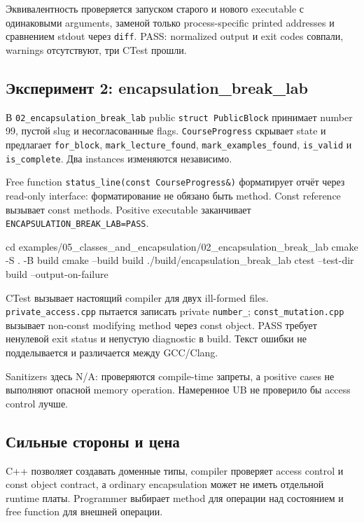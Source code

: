 Эквивалентность проверяется запуском старого и нового executable с одинаковыми
arguments, заменой только process-specific printed addresses и сравнением
stdout через \texttt{diff}. PASS: normalized output и exit codes совпали,
warnings отсутствуют, три CTest прошли.

\subsection{Эксперимент 2: encapsulation\_break\_lab}

В \texttt{02\_encapsulation\_break\_lab} public
\texttt{struct PublicBlock} принимает number 99, пустой slug и несогласованные
flags. \texttt{CourseProgress} скрывает state и предлагает
\texttt{for\_block}, \texttt{mark\_lecture\_found},
\texttt{mark\_examples\_found}, \texttt{is\_valid} и
\texttt{is\_complete}. Два instances изменяются независимо.

Free function \texttt{status\_line(const CourseProgress\&)} форматирует отчёт
через read-only interface: форматирование не обязано быть method. Const
reference вызывает const methods. Positive executable заканчивает
\texttt{ENCAPSULATION\_BREAK\_LAB=PASS}.

\begin{shellcode}
cd examples/05_classes_and_encapsulation/02_encapsulation_break_lab
cmake -S . -B build
cmake --build build
./build/encapsulation_break_lab
ctest --test-dir build --output-on-failure
\end{shellcode}

CTest вызывает настоящий compiler для двух ill-formed files.
\texttt{private\_access.cpp} пытается записать private \texttt{number\_};
\texttt{const\_mutation.cpp} вызывает non-const modifying method через const
object. PASS требует ненулевой exit status и непустую diagnostic в build.
Текст ошибки не подделывается и различается между GCC/Clang.

Sanitizers здесь N/A: проверяются compile-time запреты, а positive cases не
выполняют опасной memory operation. Намеренное UB не проверило бы access
control лучше.

\subsection{Сильные стороны и цена}

C++ позволяет создавать доменные типы, compiler проверяет access control и
const object contract, а ordinary encapsulation может не иметь отдельной
runtime платы. Programmer выбирает method для операции над состоянием и free
function для внешней операции.

